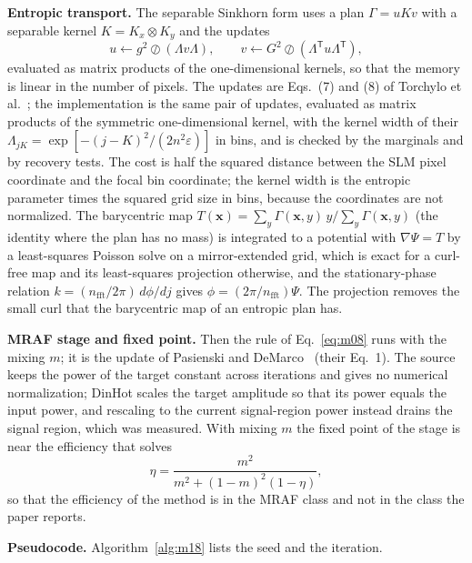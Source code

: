 \textbf{Entropic transport.} The separable Sinkhorn form uses a plan $\Gamma=uKv$ with a separable kernel $K=K_x\otimes K_y$ and the updates
\begin{equation}
u\leftarrow g^2\oslash(\Lambda v\Lambda),\qquad v\leftarrow G^2\oslash(\Lambda^{\mathsf T}u\Lambda^{\mathsf T}),
\label{eq:m18-sinkhorn}
\end{equation}
evaluated as matrix products of the one-dimensional kernels, so that the memory is linear in the number of pixels. The updates are Eqs.~(7) and (8) of Torchylo et al.~\cite{torchylo}; the implementation is the same pair of updates, evaluated as matrix products of the symmetric one-dimensional kernel, with the kernel width of their $\Lambda_{jK}=\exp[-(j-K)^2/(2n^2\varepsilon)]$ in bins, and is checked by the marginals and by recovery tests. The cost is half the squared distance between the SLM pixel coordinate and the focal bin coordinate; the kernel width is the entropic parameter times the squared grid size in bins, because the coordinates are not normalized. The barycentric map $T(\mathbf x)=\sum_y\Gamma(\mathbf x,y)\,y/\sum_y\Gamma(\mathbf x,y)$ (the identity where the plan has no mass) is integrated to a potential with $\nabla\Psi=T$ by a least-squares Poisson solve on a mirror-extended grid, which is exact for a curl-free map and its least-squares projection otherwise, and the stationary-phase relation $k=(n_{\mathrm{fft}}/2\pi)\,d\phi/dj$ gives $\phi=(2\pi/n_{\mathrm{fft}})\Psi$. The projection removes the small curl that the barycentric map of an entropic plan has.

\textbf{MRAF stage and fixed point.} Then the rule of Eq.~\eqref{eq:m08} runs with the mixing $m$; it is the update of Pasienski and DeMarco~\cite{pasienski} (their Eq.~1). The source keeps the power of the target constant across iterations and gives no numerical normalization; DinHot scales the target amplitude so that its power equals the input power, and rescaling to the current signal-region power instead drains the signal region, which was measured. With mixing $m$ the fixed point of the stage is near the efficiency that solves
\begin{equation}
\eta=\frac{m^2}{m^2+(1-m)^2(1-\eta)},
\label{eq:m18-fixed}
\end{equation}
so that the efficiency of the method is in the MRAF class and not in the class the paper reports.

\textbf{Pseudocode.} Algorithm~\ref{alg:m18} lists the seed and the iteration.


